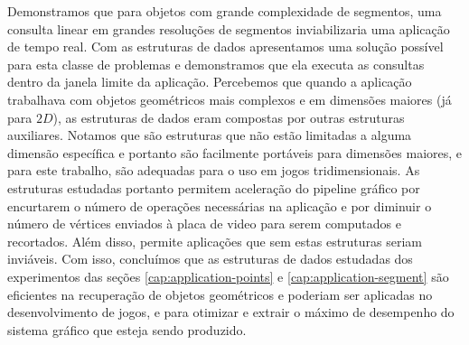 Demonstramos que para objetos com grande complexidade de segmentos, uma consulta linear em grandes resoluções de segmentos inviabilizaria uma aplicação de tempo real. Com as estruturas de dados apresentamos uma solução possível para esta classe de problemas e demonstramos que ela executa as consultas dentro da janela limite da aplicação. Percebemos que quando a aplicação trabalhava com objetos geométricos mais complexos e em dimensões maiores (já para $2D$), as estruturas de dados eram compostas por outras estruturas auxiliares. Notamos que são estruturas que não estão limitadas a alguma dimensão específica e portanto são facilmente portáveis para dimensões maiores, e para este trabalho, são adequadas para o uso em jogos tridimensionais. As estruturas estudadas portanto permitem aceleração do pipeline gráfico por encurtarem o número de operações necessárias na aplicação e por diminuir o número de vértices enviados à placa de video para serem computados e recortados. Além disso, permite aplicações que sem estas estruturas seriam inviáveis. Com isso, concluímos que as estruturas de dados estudadas dos experimentos das seções \ref{cap:application-points} e \ref{cap:application-segment} são eficientes na recuperação de objetos geométricos e poderiam ser aplicadas no desenvolvimento de jogos, e para otimizar e extrair o máximo de desempenho do sistema gráfico que esteja sendo produzido.